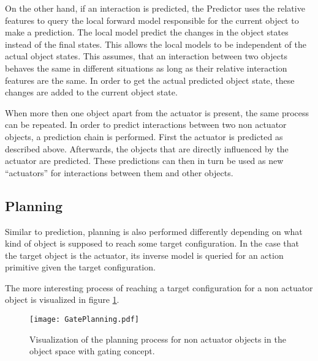 On the other hand, if an interaction is predicted, the Predictor uses the relative features to query the local forward model responsible for the current object to make a prediction. The local model predict the changes in the object states instead of the final states. This allows the local models to be independent of the actual object states. This assumes, that an interaction between two objects behaves the same in different situations as long as their relative interaction features are the same. In order to get the actual predicted object state, these changes are added to the current object state.

When more then one object apart from the actuator is present, the same process can be repeated. In order to predict interactions between two non actuator objects, a prediction chain is performed. First the actuator is predicted as described above. Afterwards, the objects that are directly influenced by the actuator are predicted. These predictions can then in turn be used as new \enquote{actuators} for interactions between them and other objects. 


\subsection{Planning}

Similar to prediction, planning is also performed differently depending on what kind of object is supposed to reach some target configuration. In the case that the target object is the actuator, its inverse model is queried for an action primitive given the target configuration. 

The more interesting process of reaching a target configuration for a non actuator object is visualized in figure \ref{fig:GatePlanning}.

\begin{figure}
	\centering
	\texttt{[image: GatePlanning.pdf]}
	\caption{Visualization of the planning process for non actuator objects in the object space with gating concept. } 
	\label{fig:GatePlanning}
\end{figure}

